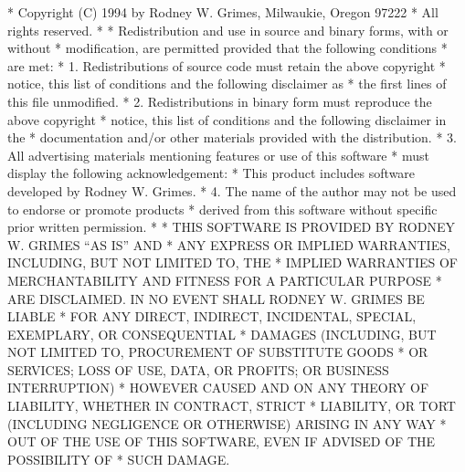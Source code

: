 \begin{copyrightEnv}
 * Copyright (C) 1994 by Rodney W. Grimes, Milwaukie, Oregon  97222
 * All rights reserved.
 *
 * Redistribution and use in source and binary forms, with or without
 * modification, are permitted provided that the following conditions
 * are met:
 * 1. Redistributions of source code must retain the above copyright
 *    notice, this list of conditions and the following disclaimer as
 *    the first lines of this file unmodified.
 * 2. Redistributions in binary form must reproduce the above copyright
 *    notice, this list of conditions and the following disclaimer in the
 *    documentation and/or other materials provided with the distribution.
 * 3. All advertising materials mentioning features or use of this software
 *    must display the following acknowledgement:
 *      This product includes software developed by Rodney W. Grimes.
 * 4. The name of the author may not be used to endorse or promote products
 *    derived from this software without specific prior written permission.
 *
 * THIS SOFTWARE IS PROVIDED BY RODNEY W. GRIMES ``AS IS'' AND
 * ANY EXPRESS OR IMPLIED WARRANTIES, INCLUDING, BUT NOT LIMITED TO, THE
 * IMPLIED WARRANTIES OF MERCHANTABILITY AND FITNESS FOR A PARTICULAR PURPOSE
 * ARE DISCLAIMED.  IN NO EVENT SHALL RODNEY W. GRIMES BE LIABLE
 * FOR ANY DIRECT, INDIRECT, INCIDENTAL, SPECIAL, EXEMPLARY, OR CONSEQUENTIAL
 * DAMAGES (INCLUDING, BUT NOT LIMITED TO, PROCUREMENT OF SUBSTITUTE GOODS
 * OR SERVICES; LOSS OF USE, DATA, OR PROFITS; OR BUSINESS INTERRUPTION)
 * HOWEVER CAUSED AND ON ANY THEORY OF LIABILITY, WHETHER IN CONTRACT, STRICT
 * LIABILITY, OR TORT (INCLUDING NEGLIGENCE OR OTHERWISE) ARISING IN ANY WAY
 * OUT OF THE USE OF THIS SOFTWARE, EVEN IF ADVISED OF THE POSSIBILITY OF
 * SUCH DAMAGE.
\end{copyrightEnv}

